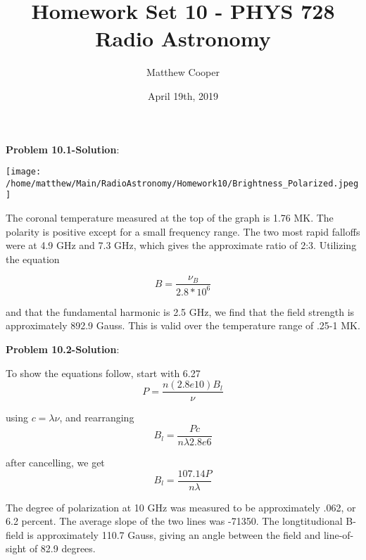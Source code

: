 \documentclass{article}
\title{Homework Set 10 - PHYS 728 Radio Astronomy}
\author{Matthew Cooper}
\date{April 19th, 2019}
\begin{document}
\begin{titlepage}
\maketitle
\end{titlepage}

\textbf{Problem 10.1-Solution}:  

\smallskip
\texttt{[image: /home/matthew/Main/RadioAstronomy/Homework10/Brightness\_Polarized.jpeg]}

The coronal temperature measured at the top of the graph is 1.76 MK.  The polarity is positive except for a small frequency range.  The two most rapid falloffs were at 4.9 GHz and 7.3 GHz, which gives the approximate ratio of 2:3.  Utilizing the equation

\begin{equation}
B = \frac{\nu_B}{2.8*10^6}
\end{equation}

and that the fundamental harmonic is 2.5 GHz, we find that the field strength is approximately 892.9 Gauss.  This is valid over the temperature range of .25-1 MK.

\bigskip
\textbf{Problem 10.2-Solution}:  

To show the equations follow, start with 6.27
\begin{equation}
P = \frac{n(2.8e10)B_l}{\nu}
\end{equation}

using $c=\lambda \nu$, and rearranging
\begin{equation}
B_l = \frac{Pc}{n\lambda 2.8e6}
\end{equation}

after cancelling, we get
\begin{equation}
B_l = \frac{107.14P}{n\lambda}
\end{equation}

The degree of polarization at 10 GHz was measured to be approximately .062, or 6.2 percent.  The average slope of the two lines was -71350.  The longtitudional B-field is approximately 110.7 Gauss, giving an angle between the field and line-of-sight of 82.9 degrees.
\end{document}
